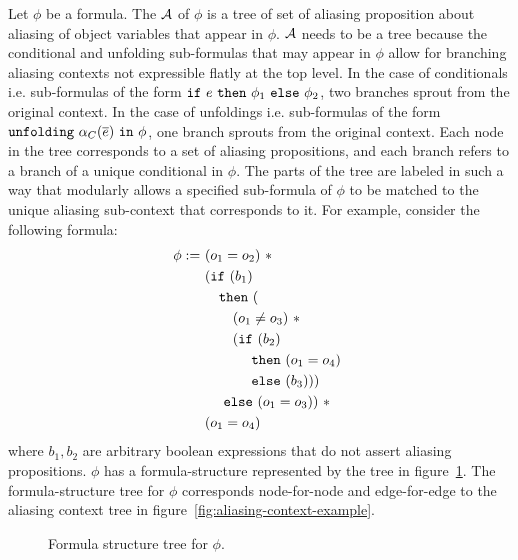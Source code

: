 Let $\phi$ be a formula.
The  $\mathcal{A}$ of $\phi$ is a tree of set of aliasing proposition about aliasing of object variables that appear in $\phi$.
$\mathcal{A}$ needs to be a tree because the conditional and unfolding sub-formulas that may appear in $\phi$ allow for branching aliasing contexts not expressible flatly at the top level.
In the case of conditionals i.e. sub-formulas of the form $\cif \ e \ \cthen \ \phi_1 \ \celse \ \phi_2$, two branches sprout from the original context.
In the case of unfoldings i.e. sub-formulas of the form $\cunfolding \ \alpha_C(\vec{e}) \ \cin \ \phi$, one branch sprouts from the original context.
Each node in the tree corresponds to a set of aliasing propositions, and each branch refers to a branch of a unique conditional in $\phi$.
The parts of the tree are labeled in such a way that modularly allows a specified sub-formula of $\phi$ to be matched to the unique aliasing sub-context that corresponds to it.
For example, consider the following formula:
\begin{align*}
  \phi
  :=
  \  & \hspace{0em} (o_1 = o_2) \ \ast
  \\ & \hspace{0em} (\texttt{if} \ (b_1)
  \\ & \hspace{1em}    \texttt{then} \ (
  \\ & \hspace{2em}      (o_1 \neq o_3) \ \ast \
  \\ & \hspace{2em}      (\texttt{if} \ (b_2)
  \\ & \hspace{3em}        \ \texttt{then} \ (o_1 = o_4) \
  \\ & \hspace{3em}        \ \texttt{else} \ (b_3)))
  \\ & \hspace{1em}    \ \texttt{else} \ (o_1 = o_3)) \ \ast
  \\ & \hspace{0em} (o_1 = o_4)
\end{align*}
where $b_1, b_2$ are arbitrary boolean expressions that do not assert aliasing propositions.
$\phi$ has a formula-structure represented by the tree in figure~\ref{fig:aliasing-context-formula-example}.
The formula-structure tree for $\phi$ corresponds node-for-node and edge-for-edge to the aliasing context tree in figure~\ref{fig:aliasing-context-example}.
\\
%
\begin{figure}[h!]
  \label{fig:aliasing-context-formula-example}
  \caption{Formula structure tree for $\phi$.}
  \vspace{1em}
  
\end{figure}
